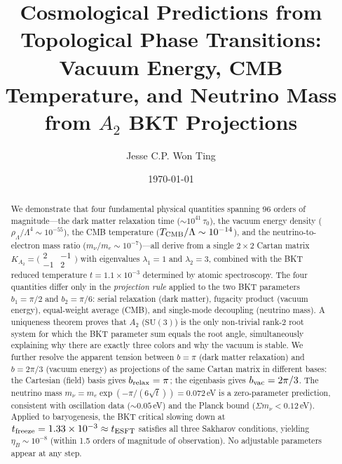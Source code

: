 \documentclass[twocolumn,preprintnumbers,amsmath,amssymb,prd]{revtex4-2}
\begin{document}
\title{Cosmological Predictions from Topological Phase Transitions:\\Vacuum Energy, CMB Temperature, and Neutrino Mass\\from $A_2$ BKT Projections}

\author{Jesse C.P. Won Ting}

\date{\today}

\begin{abstract}
We demonstrate that four fundamental physical quantities spanning 96 orders of magnitude---the dark matter relaxation time ($\sim 10^{41}\,\tau_0$), the vacuum energy density ($\rho_\Lambda/\Lambda^4 \sim 10^{-55}$), the CMB temperature ($T_{\rm CMB}/\Lambda \sim 10^{-14}$), and the neutrino-to-electron mass ratio ($m_\nu/m_e \sim 10^{-7}$)---all derive from a single $2\times2$ Cartan matrix $K_{A_2} = \bigl(\begin{smallmatrix}2 & -1\\ -1 & 2\end{smallmatrix}\bigr)$ with eigenvalues $\lambda_1 = 1$ and $\lambda_2 = 3$, combined with the BKT reduced temperature $t = 1.1\times10^{-3}$ determined by atomic spectroscopy.
The four quantities differ only in the \emph{projection rule} applied to the two BKT parameters $b_1 = \pi/2$ and $b_2 = \pi/6$: serial relaxation (dark matter), fugacity product (vacuum energy), equal-weight average (CMB), and single-mode decoupling (neutrino mass).
A uniqueness theorem proves that $A_2$ ($\mathrm{SU}(3)$) is the only non-trivial rank-2 root system for which the BKT parameter sum equals the root angle, simultaneously explaining why there are exactly three colors and why the vacuum is stable.
We further resolve the apparent tension between $b = \pi$ (dark matter relaxation) and $b = 2\pi/3$ (vacuum energy) as projections of the same Cartan matrix in different bases: the Cartesian (field) basis gives $b_{\rm relax} = \pi$; the eigenbasis gives $b_{\rm vac} = 2\pi/3$.
The neutrino mass $m_\nu = m_e \exp(-\pi/(6\sqrt{t})) = 0.072\,$eV is a zero-parameter prediction, consistent with oscillation data ($\sim 0.05\,$eV) and the Planck bound ($\Sigma m_\nu < 0.12\,$eV).
Applied to baryogenesis, the BKT critical slowing down at $t_{\rm freeze} = 1.33\times10^{-3} \approx t_{\rm ESFT}$ satisfies all three Sakharov conditions, yielding $\eta_B \sim 10^{-8}$ (within 1.5 orders of magnitude of observation).
No adjustable parameters appear at any step.
\end{abstract}
\end{document}
